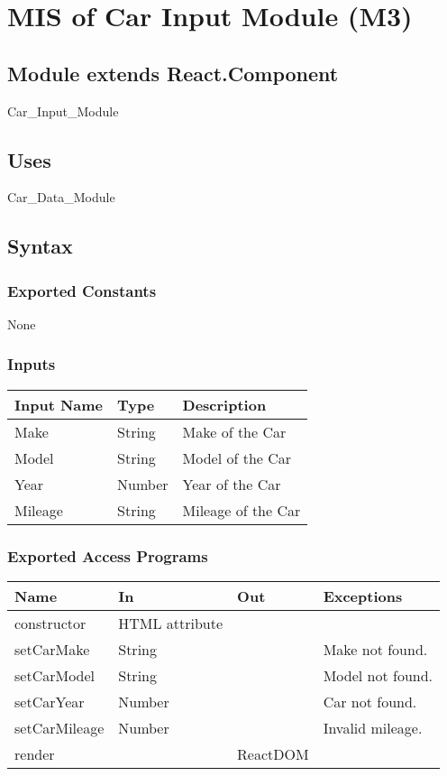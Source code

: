 \documentclass[12pt, titlepage]{article}
\begin{document}
\section{MIS of Car Input Module (M3)} 

\label{Module} 

\subsection{Module extends React.Component}

Car\_Input\_Module

\subsection{Uses}

Car\_Data\_Module

\subsection{Syntax}

\subsubsection{Exported Constants}

None

\subsubsection{Inputs}
\begin{tabular}{| l | l | l |}
  \hline
  \textbf{Input Name} & \textbf{Type} & \textbf{Description}\\
  \hline
  Make & String & Make of the Car \\
  \hline
  Model & String & Model of the Car \\
  \hline
  Year & Number & Year of the Car \\
  \hline
  Mileage & String & Mileage of the Car \\
  \hline
\end{tabular}

\subsubsection{Exported Access Programs}

\begin{tabular}{| l | l | l | l |}
  \hline
  \textbf{Name} & \textbf{In} & \textbf{Out} & \textbf{Exceptions}\\
  \hline
  constructor & HTML attribute & ~ & ~\\
  \hline
  setCarMake & String & ~ & Make not found.\\
  \hline
  setCarModel & String & ~ & Model not found.\\
  \hline
  setCarYear & Number & ~ & Car not found.\\
  \hline
  setCarMileage & Number & ~ & Invalid mileage.\\
  \hline
  render & ~ & ReactDOM & ~\\
  \hline
\end{tabular}
\end{document}
